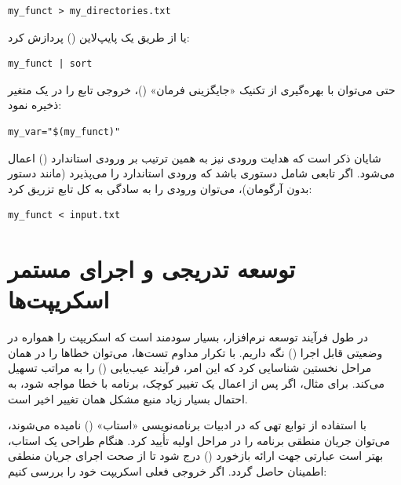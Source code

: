 \begin{latin}
\begin{lstlisting}
my_funct > my_directories.txt
\end{lstlisting}
\end{latin}

یا از طریق یک پایپ‌لاین () پردازش کرد:

\begin{latin}
\begin{lstlisting}
my_funct | sort
\end{lstlisting}
\end{latin}

حتی می‌توان با بهره‌گیری از تکنیک «جایگزینی فرمان» ()، خروجی تابع را در یک متغیر ذخیره نمود:

\begin{latin}
\begin{lstlisting}
my_var="$(my_funct)"
\end{lstlisting}
\end{latin}

شایان ذکر است که هدایت ورودی نیز به همین ترتیب بر ورودی استاندارد () اعمال می‌شود. اگر تابعی شامل دستوری باشد که ورودی استاندارد را می‌پذیرد (مانند دستور  بدون آرگومان)، می‌توان ورودی را به سادگی به کل تابع تزریق کرد:

\begin{latin}
\begin{lstlisting}
my_funct < input.txt
\end{lstlisting}
\end{latin}

\section{توسعه تدریجی و اجرای مستمر اسکریپت‌ها}

در طول فرآیند توسعه نرم‌افزار، بسیار سودمند است که اسکریپت را همواره در وضعیتی قابل اجرا () نگه داریم. با تکرار مداوم تست‌ها، می‌توان خطاها را در همان مراحل نخستین شناسایی کرد که این امر، فرآیند عیب‌یابی () را به مراتب تسهیل می‌کند. برای مثال، اگر پس از اعمال یک تغییر کوچک، برنامه با خطا مواجه شود، به احتمال بسیار زیاد منبع مشکل همان تغییر اخیر است.

با استفاده از توابع تهی که در ادبیات برنامه‌نویسی «استاب» () نامیده می‌شوند، می‌توان جریان منطقی برنامه را در مراحل اولیه تأیید کرد. هنگام طراحی یک استاب، بهتر است عبارتی جهت ارائه بازخورد () درج شود تا از صحت اجرای جریان منطقی اطمینان حاصل گردد. اگر خروجی فعلی اسکریپت خود را بررسی کنیم:

